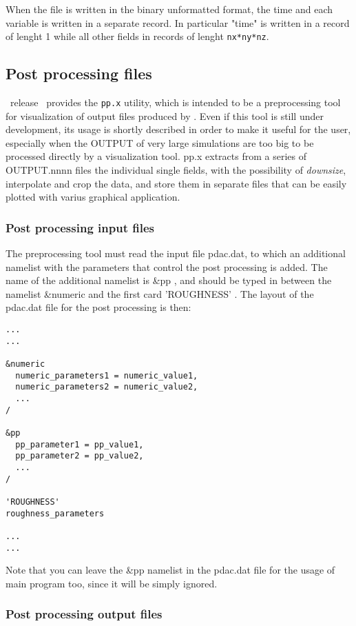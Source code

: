 When the file is written in the binary unformatted format,
the time and each variable is written in a separate record.
In particular "time" is written in a record of lenght 1
while all other fields in records of lenght {\tt nx*ny*nz}.

\subsection{Post processing files}
\label{sect:pp}

\PDAC\ release \PDACVERSION\ provides the \verb#pp.x# utility,
which is intended to be a preprocessing tool for visualization of
output files produced by \PDAC. Even if this tool is still under 
development, its usage is shortly described in order to make it
useful for the user, especially when the OUTPUT of very large simulations
are too big to be processed directly by a visualization tool.
pp.x extracts from a series of OUTPUT.nnnn files the individual single fields,
with the possibility of {\it downsize}, interpolate and crop the data,
and store them in separate files that can be easily plotted with
varius graphical application.

\subsubsection{Post processing input files}

The preprocessing tool must read the input file pdac.dat, to which
an additional namelist with the parameters that control the post processing
is added. The name of the additional namelist is \&pp , and
should be typed in between the namelist \&numeric and the first card
'ROUGHNESS' . The layout of the pdac.dat file for the post processing
is then:

\begin{verbatim}
...
...

&numeric
  numeric_parameters1 = numeric_value1, 
  numeric_parameters2 = numeric_value2,
  ...
/

&pp
  pp_parameter1 = pp_value1,
  pp_parameter2 = pp_value2,
  ...
/

'ROUGHNESS'
roughness_parameters

...
...
\end{verbatim}

Note that you can leave the \&pp namelist in the pdac.dat file
for the usage of main program too, since it will be simply ignored.

\subsubsection{Post processing output files}


